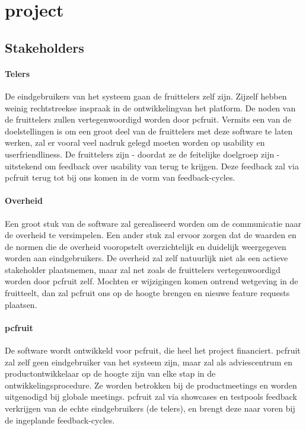 \section {project}


\subsection {Stakeholders}

\paragraph {Telers} De eindgebruikers van het systeem gaan de fruittelers zelf zijn. Zijzelf hebben weinig rechtstreekse inspraak in de ontwikkelingvan het platform. De noden van de fruittelers zullen vertegenwoordigd worden door pcfruit. Vermits een van de doelstellingen is om een groot deel van de fruittelers met deze software te laten werken, zal er vooral veel nadruk gelegd moeten worden op usability en userfriendliness. De fruittelers zijn - doordat ze de feitelijke doelgroep zijn - uitstekend om feedback over usability van terug te krijgen. Deze feedback zal via pcfruit terug tot bij ons komen in de vorm van feedback-cycles.

\paragraph {Overheid} Een groot stuk van de software zal gerealiseerd worden om de communicatie naar de overheid te versimpelen. Een ander stuk zal ervoor zorgen dat de waarden en de normen die de overheid vooropstelt overzichtelijk en duidelijk weergegeven worden aan eindgebruikers. De overheid zal zelf natuurlijk niet als een actieve stakeholder plaatsnemen, maar zal net zoals de fruittelers vertegenwoordigd worden door pcfruit zelf. Mochten er wijzigingen komen ontrend wetgeving in de fruitteelt, dan zal pcfruit ons op de hoogte brengen en nieuwe feature requests plaatsen.

\paragraph {pcfruit} De software wordt ontwikkeld voor pcfruit, die heel het project financiert. pcfruit zal zelf geen eindgebruiker van het systeem zijn, maar zal als adviescentrum en productontwikkelaar op de hoogte zijn van elke stap in de ontwikkelingsprocedure. Ze worden betrokken bij de productmeetings en worden uitgenodigd bij globale meetings. pcfruit zal via showcases en testpools feedback verkrijgen van de echte eindgebruikers (de telers), en brengt deze naar voren bij de ingeplande feedback-cycles.

